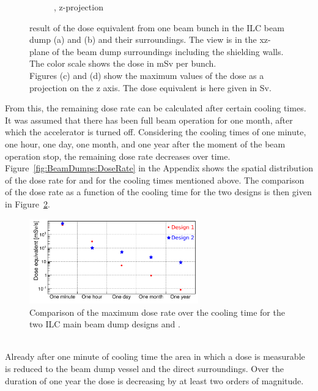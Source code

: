 \begin{figure}[h]
\begin{subfigure}[b]{0.485\textwidth}
   \caption{\designtwo, z-projection}
   \end{subfigure}
   \caption[Dose equivalent in the ILC main beam dump]{\fluka result of the dose equivalent from one beam bunch in the ILC beam dump \designone (a) and \designtwo (b) and their surroundings.
   The view is in the xz-plane of the beam dump surroundings including the shielding walls.
   The color scale shows the dose in \si[detect-all]{\milli\sievert} per bunch.
   \\Figures (c) and (d) show the maximum values of the dose as a projection on the z axis.
   The dose equivalent is here given in \si[detect-all]{\sievert}.}
   \label{fig:BeamDumps:Dose}
\end{figure}

From this, the remaining dose rate can be calculated after certain cooling times.
It was assumed that there has been full beam operation for one month, after which the accelerator is turned off.
Considering the cooling times of one minute, one hour, one day, one month, and one year after the moment of the beam operation stop, the remaining dose rate decreases over time.
Figure~\ref{fig:BeamDumps:DoseRate} in the Appendix shows the spatial distribution of the dose rate for \designone and \designtwo for the cooling times mentioned above.
The comparison of the dose rate as a function of the cooling time for the two designs is then given in Figure~\ref{fig:BeamDumps:DoseRate_Comparison}.
\begin{figure}[!h]
\centering
\includegraphics[width=0.65\textwidth]{Figures/BeamDump/DoseEQ_Time_Comparison.png}
\caption[Dose rate comparison of the ILC main beam dump designs]{Comparison of the maximum dose rate over the cooling time for the two ILC main beam dump designs \designone and \designtwo.}
\label{fig:BeamDumps:DoseRate_Comparison}
\end{figure}
\\Already after one minute of cooling time the area in which a dose is measurable is reduced to the beam dump vessel and the direct surroundings.
Over the duration of one year the dose is decreasing by at least two orders of magnitude.
